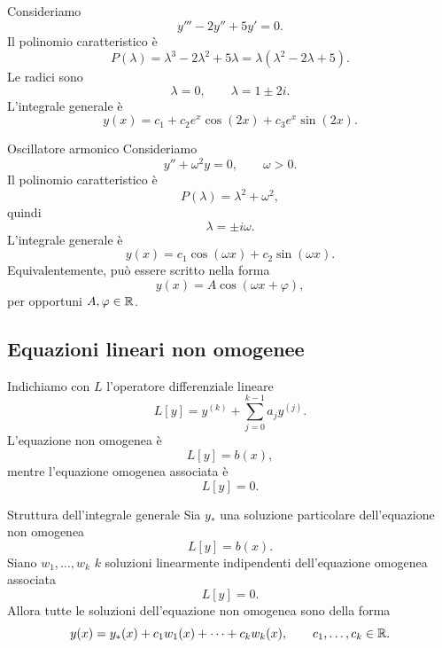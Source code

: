 \documentclass[a4paper]{article}
\begin{document}
\begin{radioactive}
\begin{snippetexample}{}
    Consideriamo
    \[
        y'''-2y''+5y'=0.
    \]
    Il polinomio caratteristico è
    \[
        P(\lambda)=\lambda^3-2\lambda^2+5\lambda
        =
        \lambda(\lambda^2-2\lambda+5).
    \]
    Le radici sono
    \[
        \lambda=0,
        \qquad
        \lambda=1\pm 2i.
    \]
    L'integrale generale è
    \[
        y(x)=c_1+c_2e^x\cos(2x)+c_3e^x\sin(2x).
    \]
\end{snippetexample}
\end{radioactive}

\begin{radioactive}
\begin{snippetexample}{Oscillatore armonico}
    Consideriamo
    \[
        y''+\omega^2y=0,
        \qquad \omega>0.
    \]
    Il polinomio caratteristico è
    \[
        P(\lambda)=\lambda^2+\omega^2,
    \]
    quindi
    \[
        \lambda=\pm i\omega.
    \]
    L'integrale generale è
    \[
        y(x)=c_1\cos(\omega x)+c_2\sin(\omega x).
    \]
    Equivalentemente, può essere scritto nella forma
    \[
        y(x)=A\cos(\omega x+\varphi),
    \]
    per opportuni \(A,\varphi\in\mathbb{R}\).
\end{snippetexample}
\end{radioactive}

\subsection{Equazioni lineari non omogenee}

\begin{radioactive}
Indichiamo con \(L\) l'operatore differenziale lineare
\[
    L[y]=y^{(k)}+\sum_{j=0}^{k-1}a_jy^{(j)}.
\]
L'equazione non omogenea è
\[
    L[y]=b(x),
\]
mentre l'equazione omogenea associata è
\[
    L[y]=0.
\]
\end{radioactive}

\begin{radioactive}
\begin{snippetproposition}{Struttura dell'integrale generale}
    Sia \(y_\ast\) una soluzione particolare dell'equazione non omogenea
    \[
        L[y]=b(x).
    \]
    Siano \(w_1,\ldots,w_k\) \(k\) soluzioni linearmente indipendenti dell'equazione omogenea associata
    \[
        L[y]=0.
    \]
    Allora tutte le soluzioni dell'equazione non omogenea sono della forma
    \[
        y(x)=y_\ast(x)+c_1w_1(x)+\cdots+c_kw_k(x),
        \qquad c_1,\ldots,c_k\in\mathbb{R}.
    \]
\end{snippetproposition}
\end{radioactive}
\end{document}
